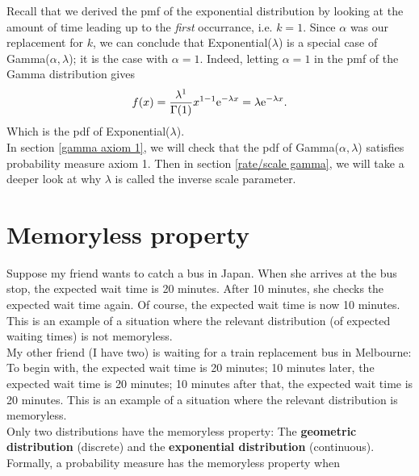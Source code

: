 \noindent Recall that we derived the pmf of the exponential distribution by looking at the amount of time leading up to the \textit{first} occurrance, i.e. $k = 1$. Since $\alpha$ was our replacement for $k$, we can conclude that Exponential($\lambda$) is a special case of Gamma($\alpha, \lambda$); it is the case with $\alpha = 1$. Indeed, letting $\alpha = 1$ in the pmf of the Gamma distribution gives
\[
f(x) = \frac{\lambda^1}{\Gamma(1)}x^{1-1}\mathrm{e}^{-\lambda x} = \lambda \mathrm{e}^{-\lambda x}.
\]
Which is the pdf of Exponential($\lambda$). \\

\noindent In section \ref{gamma axiom 1}, we will check that the pdf of Gamma($\alpha,\lambda$) satisfies probability measure axiom 1. Then in section \ref{rate/scale gamma}, we will take a deeper look at why $\lambda$ is called the inverse scale parameter.

\section{Memoryless property} \label{memoryless property}
Suppose my friend wants to catch a bus in Japan. When she arrives at the bus stop, the expected wait time is 20 minutes. After 10 minutes, she checks the expected wait time again. Of course, the expected wait time is now 10 minutes. This is an example of a situation where the relevant distribution (of expected waiting times) is not memoryless. \\

\noindent My other friend (I have two) is waiting for a train replacement bus in Melbourne: To begin with, the expected wait time is 20 minutes; 10 minutes later, the expected wait time is 20 minutes; 10 minutes after that, the expected wait time is 20 minutes. This is an example of a situation where the relevant distribution is memoryless. \\

\noindent Only two distributions have the memoryless property: The \textbf{geometric distribution} (discrete) and the \textbf{exponential distribution} (continuous). \\

\noindent Formally, a probability measure has the memoryless property when

  	\bigskip
	
	\hfil{}
	\bigskip


